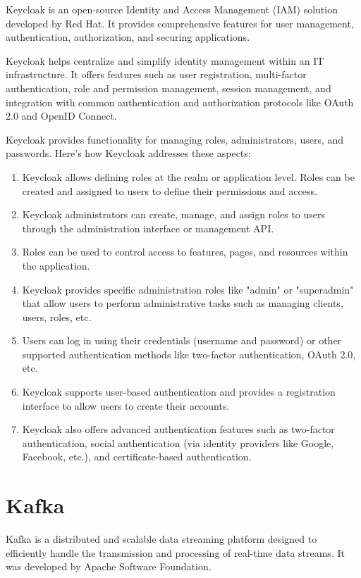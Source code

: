 Keycloak is an open-source Identity and Access Management (IAM) solution developed by Red Hat. It provides comprehensive features for user management, authentication, authorization, and securing applications.

Keycloak helps centralize and simplify identity management within an IT infrastructure. It offers features such as user registration, multi-factor authentication, role and permission management, session management, and integration with common authentication and authorization protocols like OAuth 2.0 and OpenID Connect.

Keycloak provides functionality for managing roles, administrators, users, and passwords. Here's how Keycloak addresses these aspects:

\cite{keycloak}

\begin{enumerate}
\item Keycloak allows defining roles at the realm or application level. Roles can be created and assigned to users to define their permissions and access.
\item Keycloak administrators can create, manage, and assign roles to users through the administration interface or management API.
\item Roles can be used to control access to features, pages, and resources within the application.
\item Keycloak provides specific administration roles like "admin" or "superadmin" that allow users to perform administrative tasks such as managing clients, users, roles, etc.
\item Users can log in using their credentials (username and password) or other supported authentication methods like two-factor authentication, OAuth 2.0, etc.
\item Keycloak supports user-based authentication and provides a registration interface to allow users to create their accounts.
\item Keycloak also offers advanced authentication features such as two-factor authentication, social authentication (via identity providers like Google, Facebook, etc.), and certificate-based authentication.
\end{enumerate}

\section{Kafka}

Kafka is a distributed and scalable data streaming platform designed to efficiently handle the transmission and processing of real-time data streams. It was developed by Apache Software Foundation.

